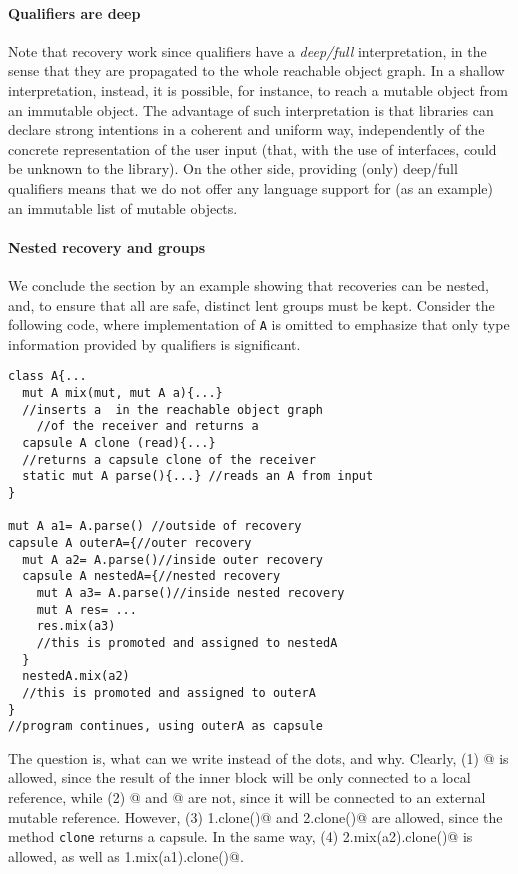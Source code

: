 \paragraph{Qualifiers are deep} Note that recovery work since qualifiers have a \emph{deep/full} interpretation, in the sense that
they are propagated to the whole reachable object graph. In
a shallow interpretation, instead, it is possible, for instance,
to reach a mutable object from an immutable object. The
advantage of such interpretation is that libraries can declare strong intentions in a coherent and uniform way, independently of the concrete representation of the user input
(that, with the use of interfaces, could be unknown to the
library). On the other side, providing (only) deep/full qualifiers
means that we do not offer any language support for (as an
example) an immutable list of mutable objects.

\paragraph{Nested recovery and groups}
We conclude the section by an example showing that {recoveries} can be nested, {and, to ensure that all are safe, distinct lent groups must be kept.}
Consider the following code, where implementation of \lstinline{A}{} is omitted to emphasize that only type information provided by qualifiers is significant.
\begin{lstlisting}
class A{...
  mut A mix(mut, mut A a){...}
  //inserts a  in the reachable object graph 
    //of the receiver and returns a
  capsule A clone (read){...} 
  //returns a capsule clone of the receiver
  static mut A parse(){...} //reads an A from input
}

mut A a1= A.parse() //outside of recovery
capsule A outerA={//outer recovery
  mut A a2= A.parse()//inside outer recovery
  capsule A nestedA={//nested recovery
    mut A a3= A.parse()//inside nested recovery
    mut A res= ...
    res.mix(a3)
    //this is promoted and assigned to nestedA
  }
  nestedA.mix(a2)
  //this is promoted and assigned to outerA
}
//program continues, using outerA as capsule
\end{lstlisting}

The question is, what can we write instead of the dots, and why.
Clearly, (1) @ is allowed, {since the result of the inner block will be only connected to a local reference}, while
(2) @ and @ are not, since it will be connected to an external mutable reference. 
However, (3) \Q@a1.clone()@ and \Q@a2.clone()@ are allowed, since the method \lstinline{clone} returns a capsule.
In the same way,
(4) \Q@a2.mix(a2).clone()@ is allowed, as well as
 \Q@a1.mix(a1).clone()@.

